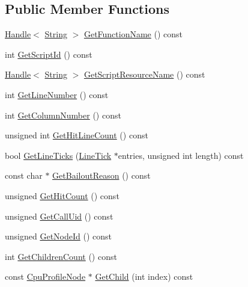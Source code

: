 \subsection*{Public Member Functions}
\begin{DoxyCompactItemize}
\item 
\hyperlink{classv8_1_1Handle}{Handle}$<$ \hyperlink{classv8_1_1String}{String} $>$ \hyperlink{classv8_1_1CpuProfileNode_affbc7842b66986012285602ab65aa5f8}{Get\+Function\+Name} () const 
\item 
int \hyperlink{classv8_1_1CpuProfileNode_acf6f384df08ec40ff306d3e229f77258}{Get\+Script\+Id} () const 
\item 
\hyperlink{classv8_1_1Handle}{Handle}$<$ \hyperlink{classv8_1_1String}{String} $>$ \hyperlink{classv8_1_1CpuProfileNode_a140dd536e7096701a36be0083c18c268}{Get\+Script\+Resource\+Name} () const 
\item 
int \hyperlink{classv8_1_1CpuProfileNode_a45ea035661c7152e4f3eb47f73787a75}{Get\+Line\+Number} () const 
\item 
int \hyperlink{classv8_1_1CpuProfileNode_a43cf237ea6f254a61a6e2a81d554aa1a}{Get\+Column\+Number} () const 
\item 
unsigned int \hyperlink{classv8_1_1CpuProfileNode_ac0d6015d3859e29db07f6a7e574426d3}{Get\+Hit\+Line\+Count} () const 
\item 
bool \hyperlink{classv8_1_1CpuProfileNode_af31611e24f47519e82b52b49969ed0a4}{Get\+Line\+Ticks} (\hyperlink{structv8_1_1CpuProfileNode_1_1LineTick}{Line\+Tick} $\ast$entries, unsigned int length) const 
\item 
const char $\ast$ \hyperlink{classv8_1_1CpuProfileNode_a16cd3d8d7ef307784838a35022507031}{Get\+Bailout\+Reason} () const 
\item 
unsigned \hyperlink{classv8_1_1CpuProfileNode_a8d297f185b0bbd9f6853f6ed193b656e}{Get\+Hit\+Count} () const 
\item 
unsigned \hyperlink{classv8_1_1CpuProfileNode_a245092eb223b948fc9441664d9e2701e}{Get\+Call\+Uid} () const 
\item 
unsigned \hyperlink{classv8_1_1CpuProfileNode_ae2971c5003353a984ef72b6cddf5e298}{Get\+Node\+Id} () const 
\item 
int \hyperlink{classv8_1_1CpuProfileNode_ac4612b91e43a2901ac20c3705288955b}{Get\+Children\+Count} () const 
\item 
const \hyperlink{classv8_1_1CpuProfileNode}{Cpu\+Profile\+Node} $\ast$ \hyperlink{classv8_1_1CpuProfileNode_aa397db1e0f5147155164c5ea3e854d69}{Get\+Child} (int index) const 
\end{DoxyCompactItemize}

